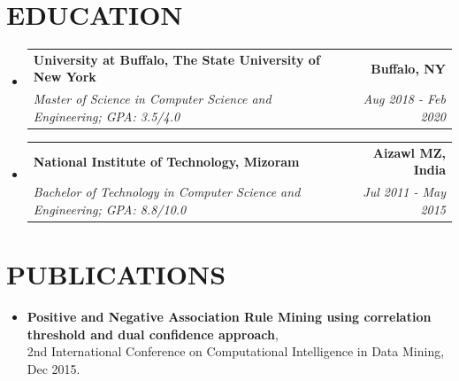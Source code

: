 \documentclass[letterpaper,11pt]{article}
\makeatletter
\newcommand{\resumeSubheading}[4]{
  \vspace{-2pt}\item
    \begin{tabular*}{1.0\textwidth}[t]{l@{\extracolsep{\fill}}r}
      \textbf{#1} & \textbf{\small #2} \\
      \textit{\small#3} & \textit{\small #4} \\
    \end{tabular*}\vspace{-7pt}
}
\newcommand{\resumeSubHeadingListStart}{\begin{itemize}[leftmargin=0.0in, label={}]}
\newcommand{\resumeSubHeadingListEnd}{\end{itemize}}
\makeatother
\begin{document}
\vspace{-16pt}

\section{EDUCATION}
  \resumeSubHeadingListStart
    \resumeSubheading
      {University at Buffalo, The State University of New York}{Buffalo, NY}
      {Master of Science in Computer Science and Engineering;  GPA: 3.5/4.0}{Aug 2018 - Feb 2020}
    \resumeSubheading
      {National Institute of Technology, Mizoram}{Aizawl MZ, India}
      {Bachelor of Technology in Computer Science and Engineering;  GPA: 8.8/10.0}{Jul 2011 - May 2015}
  \resumeSubHeadingListEnd

\vspace{-16pt}

\section{PUBLICATIONS}
\begin{itemize}[leftmargin=0.15in, label=\textbullet, itemsep=0 pt] %
    \small
    \item \textbf{Positive and Negative Association Rule Mining using correlation threshold and dual confidence approach}, \\ {2nd International Conference on Computational Intelligence in Data Mining, Dec 2015.}
\end{itemize}
\vspace{-16pt}
 
\end{document}
